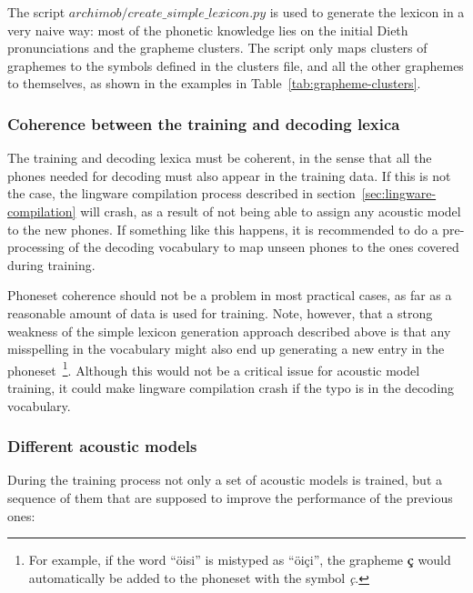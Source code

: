 \documentclass[11pt,a4paper,titlepage,twoside]{article}
\begin{document}
The script $archimob/create\_simple\_lexicon.py$ is used to generate the lexicon in a very naive way: most of the phonetic knowledge lies on the initial Dieth pronunciations and the grapheme clusters. The script only maps clusters of graphemes to the symbols defined in the clusters file, and all the other graphemes to themselves, as shown in the examples in Table~\ref{tab:grapheme-clusters}.

\subsubsection{Coherence between the training and decoding lexica}
\label{sec:coherence-lexica}

The training and decoding lexica must be coherent, in the sense that all the phones needed for decoding must also appear in the training data. If this is not the case, the lingware compilation process described in section~\ref{sec:lingware-compilation} will crash, as a result of not being able to assign any acoustic model to the new phones. If something like this happens, it is recommended to do a pre-processing of the decoding vocabulary to map unseen phones to the ones covered during training.

Phoneset coherence should not be a problem in most practical cases, as far as a reasonable amount of data is used for training. Note, however, that a strong weakness of the simple lexicon generation approach described above is that any misspelling in the vocabulary might also end up generating a new entry in the phoneset~\footnote{For example, if the word ``öisi'' is mistyped as ``öiçi'', the grapheme \textbf{ç} would automatically be added to the phoneset with the symbol \textit{ç}.}. Although this would not be a critical issue for acoustic model training, it could make lingware compilation crash if the typo is in the decoding vocabulary.

\subsubsection{Different acoustic models}
\label{sec:different-am}

During the training process not only a set of acoustic models is trained, but a sequence of them that are supposed to improve the performance of the previous ones:
\end{document}
